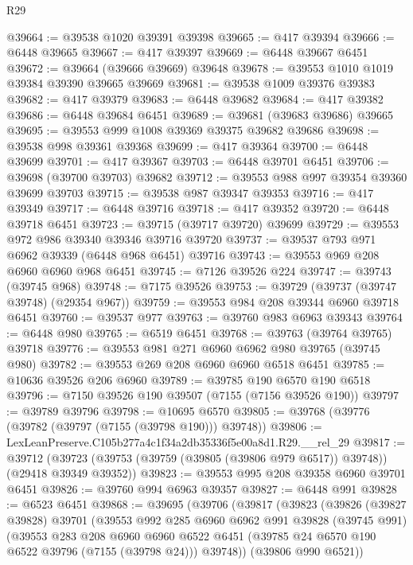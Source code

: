 \begin{lexlean}{R29}
\begin{coremodule}
@39664 := @39538 @1020 @39391 @39398
@39665 := @417 @39394
@39666 := @6448 @39665
@39667 := @417 @39397
@39669 := @6448 @39667 @6451
@39672 := @39664 (@39666 @39669) @39648
@39678 := @39553 @1010 @1019 @39384 @39390 @39665 @39669
@39681 := @39538 @1009 @39376 @39383
@39682 := @417 @39379
@39683 := @6448 @39682
@39684 := @417 @39382
@39686 := @6448 @39684 @6451
@39689 := @39681 (@39683 @39686) @39665
@39695 := @39553 @999 @1008 @39369 @39375 @39682 @39686
@39698 := @39538 @998 @39361 @39368
@39699 := @417 @39364
@39700 := @6448 @39699
@39701 := @417 @39367
@39703 := @6448 @39701 @6451
@39706 := @39698 (@39700 @39703) @39682
@39712 := @39553 @988 @997 @39354 @39360 @39699 @39703
@39715 := @39538 @987 @39347 @39353
@39716 := @417 @39349
@39717 := @6448 @39716
@39718 := @417 @39352
@39720 := @6448 @39718 @6451
@39723 := @39715 (@39717 @39720) @39699
@39729 := @39553 @972 @986 @39340 @39346 @39716 @39720
@39737 := @39537 @793 @971 @6962 @39339 (@6448 @968 @6451) @39716
@39743 := @39553 @969 @208 @6960 @6960 @968 @6451
@39745 := @7126 @39526 @224
@39747 := @39743 (@39745 @968)
@39748 := @7175 @39526
@39753 := @39729 (@39737 (@39747 @39748) (@29354 @967))
@39759 := @39553 @984 @208 @39344 @6960 @39718 @6451
@39760 := @39537 @977
@39763 := @39760 @983 @6963 @39343
@39764 := @6448 @980
@39765 := @6519 @6451
@39768 := @39763 (@39764 @39765) @39718
@39776 := @39553 @981 @271 @6960 @6962 @980 @39765 (@39745 @980)
@39782 := @39553 @269 @208 @6960 @6960 @6518 @6451
@39785 := @10636 @39526 @206 @6960
@39789 := @39785 @190 @6570 @190 @6518
@39796 := @7150 @39526 @190 @39507 (@7155 (@7156 @39526 @190))
@39797 := @39789 @39796
@39798 := @10695 @6570
@39805 := @39768 (@39776 (@39782 (@39797 (@7155 (@39798 @190))) @39748))
@39806 := LexLeanPreserve.C105b277a4c1f34a2db35336f5e00a8d1.R29.__rel_29
@39817 := @39712
    (@39723 (@39753 (@39759 (@39805 (@39806 @979 @6517)) @39748)) (@29418 @39349 @39352))
@39823 := @39553 @995 @208 @39358 @6960 @39701 @6451
@39826 := @39760 @994 @6963 @39357
@39827 := @6448 @991
@39828 := @6523 @6451
@39868 := @39695
    (@39706
      (@39817
        (@39823
          (@39826
            (@39827 @39828)
            @39701
            (@39553
              @992
              @285
              @6960
              @6962
              @991
              @39828
              (@39745 @991)
              (@39553
                @283
                @208
                @6960
                @6960
                @6522
                @6451
                (@39785 @24 @6570 @190 @6522 @39796 (@7155 (@39798 @24)))
                @39748))
            (@39806 @990 @6521))

\end{coremodule}
\end{lexlean}
